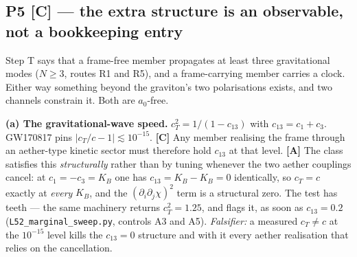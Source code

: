 \documentclass[11pt,letterpaper]{article}
\begin{document}
\subsection{P5 [C] --- the extra structure is an observable, not a bookkeeping entry}

Step T says that a frame-free member propagates at least three gravitational modes ($N\ge3$, routes R1 and R5), and a frame-carrying member carries a clock. Either way something beyond the graviton's two polarisations exists, and two channels constrain it. Both are $a_0$-free.

\textbf{(a) The gravitational-wave speed.} $c_T^2=1/(1-c_{13})$ with $c_{13}=c_1+c_3$. GW170817 \cite{Abbott2017gw170817} pins $|c_T/c-1|\lesssim10^{-15}$. \textbf{[C]} Any member realising the frame through an aether-type kinetic sector must therefore hold $c_{13}$ at that level. \textbf{[A]} The class satisfies this \emph{structurally} rather than by tuning whenever the two aether couplings cancel: at $c_1=-c_3=K_B$ one has $c_{13}=K_B-K_B=0$ identically, so $c_T=c$ exactly at \emph{every} $K_B$, and the $(\partial_i\partial_j\chi)^2$ term is a structural zero. The test has teeth --- the same machinery returns $c_T^2=1.25$, and flags it, as soon as $c_{13}=0.2$ (\texttt{L52\_marginal\_sweep.py}, controls A3 and A5). \emph{Falsifier:} a measured $c_T\neq c$ at the $10^{-15}$ level kills the $c_{13}=0$ structure and with it every aether realisation that relies on the cancellation.
\end{document}
